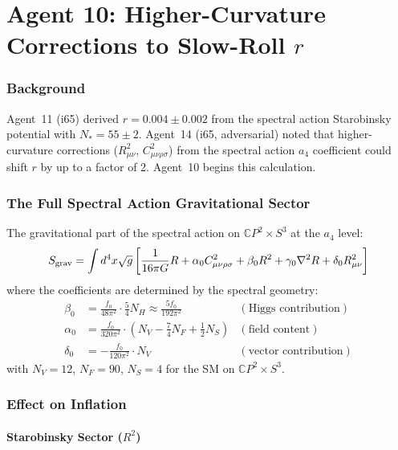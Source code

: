 \documentclass[11pt,a4paper]{article}
\newcommand{\CP}{\mathbb{C}P}
\begin{document}
\part{Agent 10: Higher-Curvature Corrections to Slow-Roll $r$}
\label{part:higher-curv}

\section{Background}

Agent~11 (i65) derived $r = 0.004 \pm 0.002$ from the spectral action Starobinsky potential with $N_* = 55 \pm 2$. Agent~14 (i65, adversarial) noted that higher-curvature corrections ($R_{\mu\nu}^2$, $C_{\mu\nu\rho\sigma}^2$) from the spectral action $a_4$ coefficient could shift $r$ by up to a factor of 2. Agent~10 begins this calculation.

\section{The Full Spectral Action Gravitational Sector}

The gravitational part of the spectral action on $\CP^2 \times S^3$ at the $a_4$ level:
\begin{equation}
S_{\rm grav} = \int d^4x \sqrt{g} \left[ \frac{1}{16\pi G} R + \alpha_0 C_{\mu\nu\rho\sigma}^2 + \beta_0 R^2 + \gamma_0 \nabla^2 R + \delta_0 R_{\mu\nu}^2 \right]
\end{equation}
where the coefficients are determined by the spectral geometry:
\begin{align}
\beta_0 &= \frac{f_0}{48\pi^2} \cdot \frac{5}{4} N_H \approx \frac{5 f_0}{192\pi^2} & (\text{Higgs contribution}) \\
\alpha_0 &= \frac{f_0}{320\pi^2} \cdot \left(N_V - \frac{7}{4}N_F + \frac{1}{2}N_S\right) & (\text{field content}) \\
\delta_0 &= -\frac{f_0}{120\pi^2} \cdot N_V & (\text{vector contribution})
\end{align}
with $N_V = 12$, $N_F = 90$, $N_S = 4$ for the SM on $\CP^2 \times S^3$.

\section{Effect on Inflation}

\subsection{Starobinsky Sector ($R^2$)}
\end{document}
